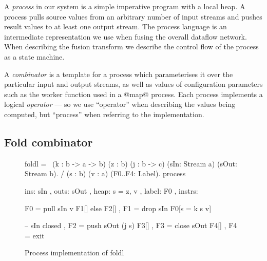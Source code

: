 %

A \emph{process} in our system is a simple imperative program with a local heap.
A process pulls source values from an arbitrary number of input streams and pushes result values to at least one output stream.
The process language is an intermediate representation we use when fusing the overall dataflow network.
When describing the fusion transform we describe the control flow of the process as a state machine.

A \emph{combinator} is a template for a process which parameterises it over the particular input and output streams, as well as values of configuration parameters such as the worker function used in a @map@ process.
Each process implements a logical \emph{operator} --- so we use ``operator'' when describing the values being computed, but ``process'' when referring to the implementation.


\subsection{Fold combinator}
\begin{figure}
\begin{process}
foldl 
  = \ (k  : b -> a -> b) (z   : b) (j : b -> c)
      (sIn: Stream a)    (sOut: Stream b). 
    / (s  : b) (v : a)   (F0..F4: Label).
    process
     { ins:    { sIn  }
     , outs:   { sOut }
     , heap:   { s = z, v }
     , label:    F0
     , instrs: { F0 = pull  sIn     v  F1[] else F2[]
               , F1 = drop  sIn        F0[s = k s v]

               -- sIn closed
               , F2 = push  sOut (j s) F3[]
               , F3 = close sOut       F4[]
               , F4 = exit } }
\end{process}
\caption{Process implementation of foldl}
\label{figs/procs/impl/foldl}
\end{figure}

